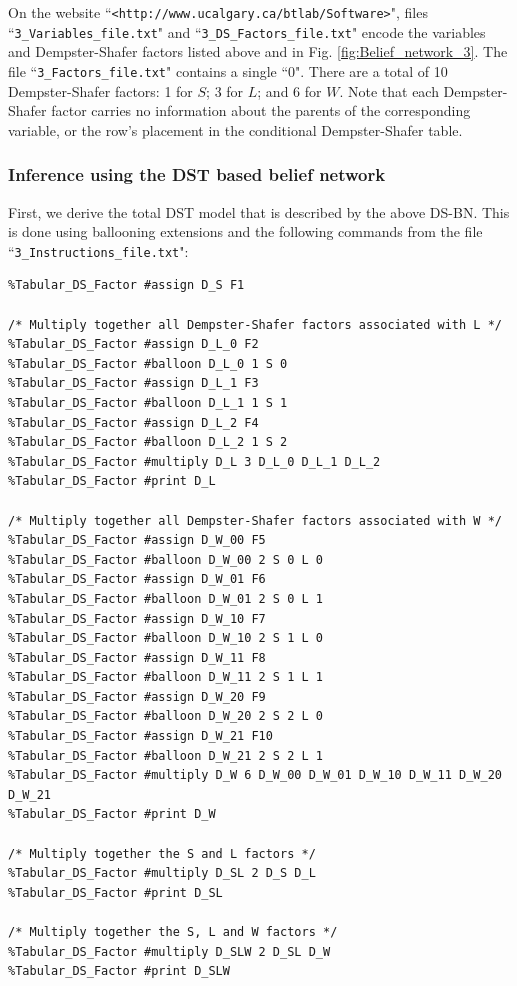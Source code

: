 \documentclass{article}
\begin{document}
\begin{sloppypar}
On the website ``\texttt{<http://www.ucalgary.ca/btlab/Software>}", files ``\texttt{3\_Variables\_file.txt}" and ``\texttt{3\_DS\_Factors\_file.txt}" encode the variables and Dempster-Shafer factors listed above and in Fig. \ref{fig:Belief_network_3}. The file ``\texttt{3\_Factors\_file.txt}" contains a single ``0". There are a total of 10 Dempster-Shafer factors: 1 for \(S\); 3 for \(L\); and 6 for \(W\). Note that each Dempster-Shafer factor carries no information about the parents of the corresponding variable, or the row's placement in the conditional Dempster-Shafer table.  
\end{sloppypar}



\subsubsection{Inference using the DST based belief network}

First, we derive the total DST model that is described by the above DS-BN. This is done using ballooning extensions and the following commands from the file ``\texttt{3\_Instructions\_file.txt}":

\begin{verbatim}
%Tabular_DS_Factor #assign D_S F1

/* Multiply together all Dempster-Shafer factors associated with L */
%Tabular_DS_Factor #assign D_L_0 F2
%Tabular_DS_Factor #balloon D_L_0 1 S 0
%Tabular_DS_Factor #assign D_L_1 F3
%Tabular_DS_Factor #balloon D_L_1 1 S 1
%Tabular_DS_Factor #assign D_L_2 F4
%Tabular_DS_Factor #balloon D_L_2 1 S 2
%Tabular_DS_Factor #multiply D_L 3 D_L_0 D_L_1 D_L_2
%Tabular_DS_Factor #print D_L

/* Multiply together all Dempster-Shafer factors associated with W */
%Tabular_DS_Factor #assign D_W_00 F5
%Tabular_DS_Factor #balloon D_W_00 2 S 0 L 0
%Tabular_DS_Factor #assign D_W_01 F6
%Tabular_DS_Factor #balloon D_W_01 2 S 0 L 1
%Tabular_DS_Factor #assign D_W_10 F7
%Tabular_DS_Factor #balloon D_W_10 2 S 1 L 0
%Tabular_DS_Factor #assign D_W_11 F8
%Tabular_DS_Factor #balloon D_W_11 2 S 1 L 1
%Tabular_DS_Factor #assign D_W_20 F9
%Tabular_DS_Factor #balloon D_W_20 2 S 2 L 0
%Tabular_DS_Factor #assign D_W_21 F10
%Tabular_DS_Factor #balloon D_W_21 2 S 2 L 1
%Tabular_DS_Factor #multiply D_W 6 D_W_00 D_W_01 D_W_10 D_W_11 D_W_20 D_W_21
%Tabular_DS_Factor #print D_W

/* Multiply together the S and L factors */
%Tabular_DS_Factor #multiply D_SL 2 D_S D_L
%Tabular_DS_Factor #print D_SL

/* Multiply together the S, L and W factors */
%Tabular_DS_Factor #multiply D_SLW 2 D_SL D_W
%Tabular_DS_Factor #print D_SLW
\end{verbatim}
\end{document}
